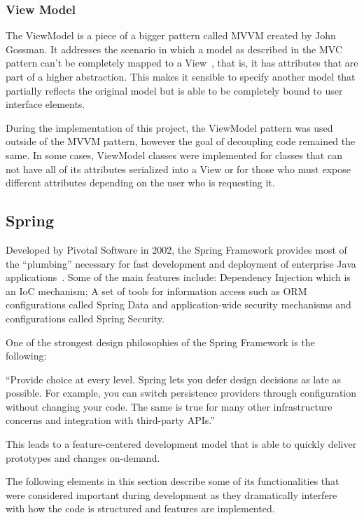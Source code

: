 \subsubsection{View Model}
The ViewModel is a piece of a bigger pattern called \gls{MVVM} created by John Gossman. It addresses the scenario in which a model as described in the \gls{MVC} pattern can't be completely mapped to a View~\cite{viewmodel}, that is, it has attributes that are part of a higher abstraction. This makes it sensible to specify another model that partially reflects the original model but is able to be completely bound to user interface elements.

During the implementation of this project, the ViewModel pattern was used outside of the \gls{MVVM} pattern, however the goal of decoupling code remained the same. In some cases, ViewModel classes were implemented for classes that can not have all of its attributes serialized into a View or for those who must expose different attributes depending on the user who is requesting it.

\subsection{Spring}\label{concept:spring}
Developed by Pivotal Software in 2002, the Spring Framework provides most of the ``plumbing'' necessary for fast development and deployment of enterprise Java applications~\cite{springdocs}. Some of the main features include: Dependency Injection which is an \gls{IoC} mechanism; A set of tools for information access such as \gls{ORM} configurations called Spring Data and application-wide security mechanisms and configurations called Spring Security.

One of the strongest design philosophies of the Spring Framework is the following:

\begin{displayquote}
``Provide choice at every level. Spring lets you defer design decisions as late as possible. For example, you can switch persistence providers through configuration without changing your code. The same is true for many other infrastructure concerns and integration with third-party \gls{API}s.''~\textcite{springdocs}
\end{displayquote}
This leads to a feature-centered development model that is able to quickly deliver prototypes and changes on-demand.

The following elements in this section describe some of its functionalities that were considered important during development as they dramatically interfere with how the code is structured and features are implemented.

